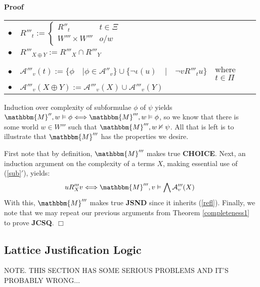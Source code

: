 \documentclass{article}
\newcommand{\assign}{:=}
\newcommand{\tmtextbf}[1]{{\bfseries{#1}}}
\newenvironment{proof}{\noindent\textbf{Proof\ }}{\hspace*{\fill}$\Box$\medskip}
\begin{document}
\begin{proof}
  \begin{center}
    \begin{tabular}{lll}
      $\bullet$ & $R'''_t \assign \left\{ \begin{array}{ll}
        R''_t & t \in \Xi\\
        W''' \times W''' & o / w
      \end{array} \right.$ & \\
      $\bullet$ & $R'''_{X \oplus Y} \assign R'''_X \cap R'''_Y$ & \\
      &  & \\
      $\bullet$ & $\mathcal{A}'''_v (t) \assign \{\phi \hspace{1em} | \phi \in
      \mathcal{A}''_v \} \cup \{\neg \iota (u) \hspace{1em} | \hspace{1em}
      \neg v R'''_t u\}$ & where $t \in \Pi$\\
      $\bullet$ & $\mathcal{A}'''_v (X \oplus Y) \assign \mathcal{A}'''_v (X)
      \cup \mathcal{A}'''_v (Y)$ & 
    \end{tabular}
  \end{center}
  
  
  
  
  
  Induction over complexity of subformulae $\phi$ of $\psi$ yields
  $\mathbbm{M}'', w \vDash \phi \Longleftrightarrow \mathbbm{M}''', w \vDash
  \phi$, so we know that there is some world $w \in W'''$ such that
  $\mathbbm{M}''', w \nvDash \psi$.  All that is left is to illustrate that
  $\mathbbm{M}'''$ has the properties we desire.
  
  
  
  First note that by definition, $\mathbbm{M}'''$ makes true
  \tmtextbf{CHOICE}.  Next, an induction argument on the complexity of a
  terms $X$, making essential use of (\ref{sub}$'$), yields:
  \[ u R_X''' v \Longleftrightarrow \mathbbm{M}''', v \vDash \bigwedge
     \mathcal{A}'''_v (X) \]
  With this, $\mathbbm{M}'''$ makes true \tmtextbf{JSND} since it inherits
  (\ref{refl}).  Finally, we note that we may repeat our previous arguments
  from Theorem \ref{completeness1} to prove \tmtextbf{JCSQ}.
\end{proof}

\subsection{Lattice Justification Logic}

{\color{red} NOTE.  THIS SECTION HAS SOME SERIOUS PROBLEMS AND IT'S PROBABLY
WRONG...}
\end{document}
